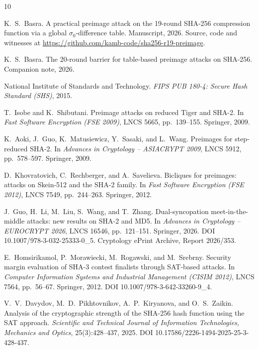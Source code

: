 \documentclass[11pt,a4paper]{article}
\begin{document}
\begin{thebibliography}{10}

K.~S.~Basra.
\newblock A practical preimage attack on the 19-round {SHA-256} compression
  function via a global $\sigma_0$-difference table.
\newblock Manuscript, 2026.  Source, code and witnesses at
  \url{https://github.com/kamb-code/sha256-r19-preimage}.

K.~S.~Basra.
\newblock The 20-round barrier for table-based preimage attacks on
  \mbox{{SHA-256}}.
\newblock Companion note, 2026.

National Institute of Standards and Technology.
\newblock \emph{{FIPS PUB 180-4}: Secure Hash Standard ({SHS})}, 2015.

T.~Isobe and K.~Shibutani.
\newblock Preimage attacks on reduced {Tiger} and {SHA-2}.
\newblock In \emph{Fast Software Encryption (FSE 2009)}, LNCS 5665,
  pp.~139--155. Springer, 2009.

K.~Aoki, J.~Guo, K.~Matusiewicz, Y.~Sasaki, and L.~Wang.
\newblock Preimages for step-reduced {SHA-2}.
\newblock In \emph{Advances in Cryptology -- ASIACRYPT 2009}, LNCS 5912,
  pp.~578--597. Springer, 2009.

D.~Khovratovich, C.~Rechberger, and A.~Savelieva.
\newblock Bicliques for preimages: attacks on {Skein-512} and the {SHA-2}
  family.
\newblock In \emph{Fast Software Encryption (FSE 2012)}, LNCS 7549,
  pp.~244--263. Springer, 2012.

J.~Guo, H.~Li, M.~Liu, S.~Wang, and T.~Zhang.
\newblock Dual-syncopation meet-in-the-middle attacks: new results on
  {SHA-2} and {MD5}.
\newblock In \emph{Advances in Cryptology -- EUROCRYPT 2026}, LNCS 16546, pp.~121--151. Springer, 2026.
  DOI 10.1007/978-3-032-25333-0\_5.  Cryptology ePrint Archive, Report
  2026/353.

E.~Homsirikamol, P.~Morawiecki, M.~Rogawski, and M.~Srebrny.
\newblock Security margin evaluation of {SHA-3} contest finalists through
  {SAT}-based attacks.
\newblock In \emph{Computer Information Systems and Industrial Management
  (CISIM 2012)}, LNCS 7564, pp.~56--67. Springer, 2012.
  DOI 10.1007/978-3-642-33260-9\_4.

V.~V.~Davydov, M.~D.~Pikhtovnikov, A.~P.~Kiryanova, and O.~S.~Zaikin.
\newblock Analysis of the cryptographic strength of the {SHA-256} hash
  function using the {SAT} approach.
\newblock \emph{Scientific and Technical Journal of Information
  Technologies, Mechanics and Optics}, 25(3):428--437, 2025.
  DOI 10.17586/2226-1494-2025-25-3-428-437.


\end{thebibliography}
\end{document}
